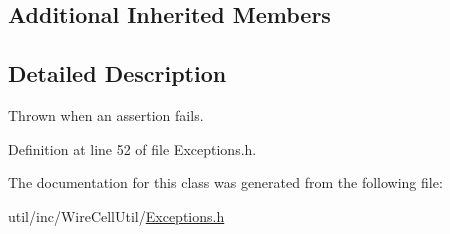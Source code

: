 \subsection*{Additional Inherited Members}


\subsection{Detailed Description}
Thrown when an assertion fails. 

Definition at line 52 of file Exceptions.\+h.



The documentation for this class was generated from the following file\+:\begin{DoxyCompactItemize}
\item 
util/inc/\+Wire\+Cell\+Util/\hyperlink{_exceptions_8h}{Exceptions.\+h}\end{DoxyCompactItemize}
